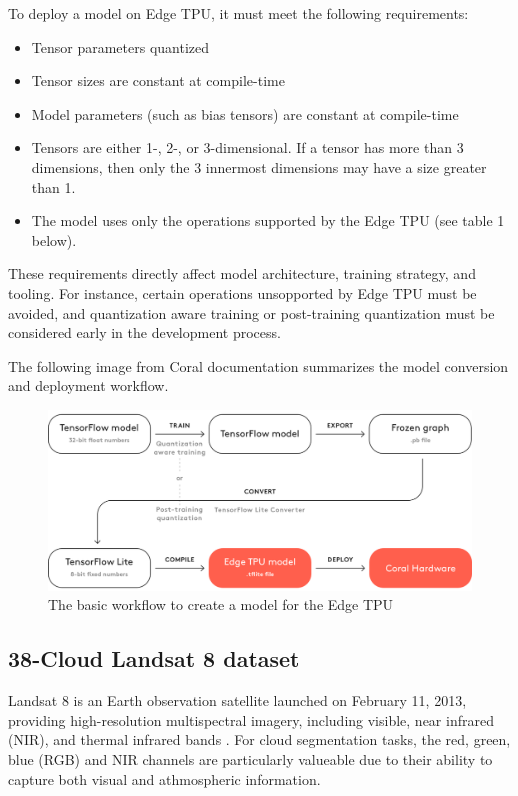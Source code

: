 {To deploy a model on Edge TPU, it must meet the following requirements:
\begin{itemize}
    \item Tensor parameters quantized
    \item Tensor sizes are constant at compile-time
    \item Model parameters (such as bias tensors) are constant at compile-time
    \item Tensors are either 1-, 2-, or 3-dimensional. If a tensor has more than 3 dimensions, then only the 3 innermost dimensions may have a size greater than 1.
    \item The model uses only the operations supported by the Edge TPU (see table 1 below). 
\end{itemize}

These requirements directly affect model architecture, training strategy, and tooling. For instance, certain operations unsopported by Edge TPU must be avoided, and quantization aware training or post-training quantization must be considered early in the development process.

The following image from Coral documentation summarizes the model conversion and deployment workflow.

\begin{figure}[H]
  \centering
  \includegraphics[width=\textwidth]{files/Edge_TPU_quantization.png}
  \caption{The basic workflow to create a model for the Edge TPU}
  \label{fig:quantization-chart}
\end{figure}

\subsection{38-Cloud Landsat 8 dataset}

Landsat 8 is an Earth observation satellite launched on February 11, 2013, providing high-resolution multispectral imagery, including visible, near infrared (NIR), and thermal infrared bands \cite{landsat8}. For cloud segmentation tasks, the red, green, blue (RGB) and NIR channels are particularly valueable due to their ability to capture both visual and athmospheric information.

}
